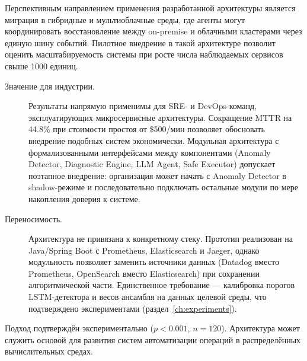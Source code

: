Перспективным направлением применения разработанной архитектуры является миграция в гибридные и мультиоблачные среды, где агенты могут координировать восстановление между on-premise и облачными кластерами через единую шину событий. Пилотное внедрение в такой архитектуре позволит оценить масштабируемость системы при росте числа наблюдаемых сервисов свыше 1000 единиц.

\begin{description}
\item[Значение для индустрии.] Результаты напрямую применимы для SRE- и DevOps-команд, эксплуатирующих микросервисные архитектуры. Сокращение MTTR на 44.8\% при стоимости простоя от \$500/мин позволяет обосновать внедрение подобных систем экономически. Модульная архитектура с формализованными интерфейсами между компонентами (Anomaly Detector, Diagnostic Engine, LLM Agent, Safe Executor) допускает поэтапное внедрение: организация может начать с Anomaly Detector в shadow-режиме и последовательно подключать остальные модули по мере накопления доверия к системе.

\item[Переносимость.] Архитектура не привязана к конкретному стеку. Прототип реализован на Java/Spring Boot с Prometheus, Elasticsearch и Jaeger, однако модульность позволяет заменить источники данных (Datadog вместо Prometheus, OpenSearch вместо Elasticsearch) при сохранении алгоритмической части. Единственное требование --- калибровка порогов LSTM-детектора и весов ансамбля на данных целевой среды, что подтверждено экспериментами (раздел~\ref{ch:experiments}).
\end{description}

Подход подтверждён экспериментально ($p < 0.001$, $n = 120$). Архитектура может служить основой для развития систем автоматизации операций в распределённых вычислительных средах.

